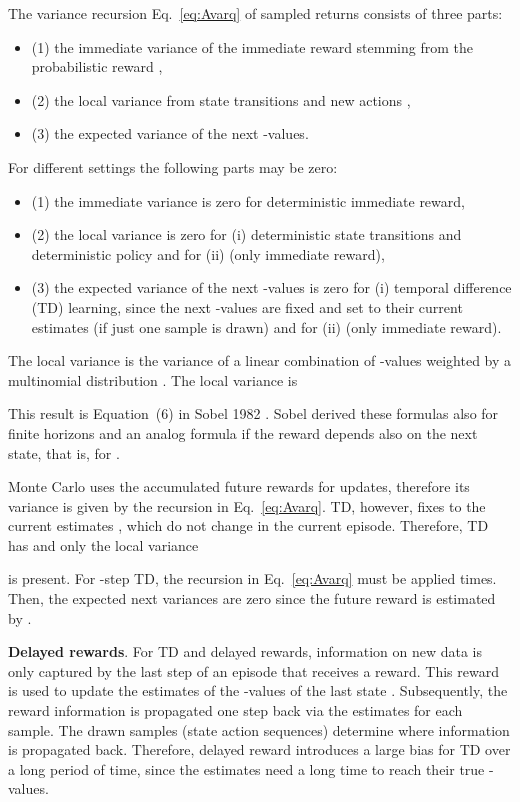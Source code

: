 \documentclass{article}
\begin{document}
\begin{appendices}
The variance recursion  Eq.~\eqref{eq:Avarq} of sampled returns consists of three parts:
\begin{itemize}
\item (1) the immediate variance
 of the
immediate reward stemming from the
probabilistic reward ,
\item (2) the local
variance  
from state transitions  and new actions ,
\item (3) the expected
variance 
of the next -values.
\end{itemize}
For different settings the following parts may be zero:
\begin{itemize}
\item (1) the immediate variance
 is zero for deterministic
immediate reward,
\item (2) the local
variance  
is zero for (i) deterministic state transitions and deterministic policy
and for (ii)  (only immediate reward),
\item (3) the expected
variance 
of the next -values is zero for (i) temporal difference (TD) learning,
since the next -values are fixed and set to their current estimates
(if just one sample is drawn)
and for (ii)  (only immediate reward).
\end{itemize}


The local variance 
is the variance of a linear combination of -values
weighted by a multinomial distribution
.
The local variance is

This result is Equation~(6) in Sobel 1982 \cite{Sobel:82}.
Sobel derived these formulas also for finite horizons and
an analog formula if the reward depends
also on the next state, that is, for .


Monte Carlo uses the accumulated future rewards for updates, therefore
its variance is given by the recursion in Eq.~\eqref{eq:Avarq}.
TD, however, fixes  to the current
estimates , which do not change in the current
episode. 
Therefore, TD has  and
only the local variance

is present.
For -step TD, the recursion in Eq.~\eqref{eq:Avarq} must be applied
 times. Then, the expected next variances are zero since
the future reward is estimated by .

{\bf Delayed rewards}.
For TD and delayed rewards, information on new data is only captured by the
last step of an episode that receives a reward. This reward is used
to update the estimates of the -values of the
last state .
Subsequently, the reward information is propagated
one step back via the estimates  for each sample.
The drawn samples (state action sequences)
determine where information is propagated back.
Therefore, delayed reward introduces a large bias for TD over a long
period of time,
since the estimates  need a long time to reach their true -values.


\end{appendices}
\end{document}

